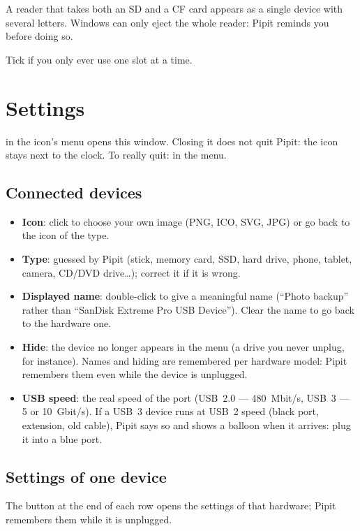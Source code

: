 A reader that takes both an SD and a CF card appears as a single device with several
letters. Windows can only eject the whole reader: Pipit reminds you before doing so.


Tick  if you only ever use one slot at a time.

\section{Settings}\label{sec:reglages}

 in the icon's menu opens this window. Closing it does not quit Pipit:
the icon stays next to the clock. To really quit:  in the menu.


\subsection{Connected devices}
\begin{itemize}
\item \textbf{Icon}: click to choose your own image (PNG, ICO, SVG, JPG) or go back to the
  icon of the type.
\item \textbf{Type}: guessed by Pipit (stick, memory card, SSD, hard drive, phone, tablet,
  camera, CD/DVD drive…); correct it if it is wrong.
\item \textbf{Displayed name}: double-click to give a meaningful name (“Photo backup”
  rather than “SanDisk Extreme Pro USB Device”). Clear the name to go back to the
  hardware one.
\item \textbf{Hide}: the device no longer appears in the menu (a drive you never unplug,
  for instance). Names and hiding are remembered per hardware model: Pipit remembers
  them even while the device is unplugged.
\end{itemize}

\begin{itemize}
\item \textbf{USB speed}: the real speed of the port (USB~2.0 — 480~Mbit/s, USB~3 — 5 or
  10~Gbit/s). If a USB~3 device runs at USB~2 speed (black port, extension, old cable),
  Pipit says so and shows a balloon when it arrives: plug it into a blue port.
\end{itemize}

\subsection{Settings of one device}
The  button at the end of each row opens the settings of that hardware;
Pipit remembers them while it is unplugged.

